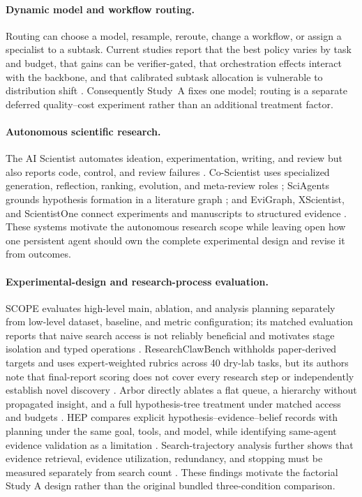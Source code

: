 \documentclass[11pt,a4paper]{article}
\begin{document}
\paragraph{Dynamic model and workflow routing.}
Routing can choose a model, resample, reroute, change a workflow, or assign a
specialist to a subtask.  Current studies report that the best policy varies by
task and budget, that gains can be verifier-gated, that orchestration effects
interact with the backbone, and that calibrated subtask allocation is vulnerable
to distribution shift
\citep{llmrouter2026,resamplereroute2026,controlledorchestration2026,agora2026}.
Consequently Study~A fixes one model; routing is a separate deferred quality--cost
experiment rather than an additional treatment factor.

\paragraph{Autonomous scientific research.}
The AI Scientist automates ideation, experimentation, writing, and review but
also reports code, control, and review failures \citep{aiscientist2024}.
Co-Scientist uses specialized generation, reflection, ranking, evolution, and
meta-review roles \citep{coscientist2025}; SciAgents grounds hypothesis
formation in a literature graph \citep{sciagents2024}; and EviGraph, XScientist,
and ScientistOne connect experiments and manuscripts to structured evidence
\citep{evigraph2026,xscientist2026,scientistone2026}.  These systems motivate
the autonomous research scope while leaving open how one persistent agent should
own the complete experimental design and revise it from outcomes.

\paragraph{Experimental-design and research-process evaluation.}
SCOPE evaluates high-level main, ablation, and analysis planning separately from
low-level dataset, baseline, and metric configuration; its matched evaluation
reports that naive search access is not reliably beneficial and motivates stage
isolation and typed operations \citep{scope2026}.  ResearchClawBench withholds
paper-derived targets and uses expert-weighted rubrics across 40 dry-lab tasks,
but its authors note that final-report scoring does not cover every research step
or independently establish novel discovery \citep{researchclawbench2026}.
Arbor directly ablates a flat queue, a hierarchy without propagated insight, and
a full hypothesis-tree treatment under matched access and budgets
\citep{arbor2026}.  HEP compares explicit hypothesis--evidence--belief records
with planning under the same goal, tools, and model, while identifying same-agent
evidence validation as a limitation \citep{hep2026}.  Search-trajectory analysis
further shows that evidence retrieval, evidence utilization, redundancy, and
stopping must be measured separately from search count \citep{searchdiagnosis2026}.
These findings motivate the factorial Study A design rather than the original
bundled three-condition comparison.
\end{document}
